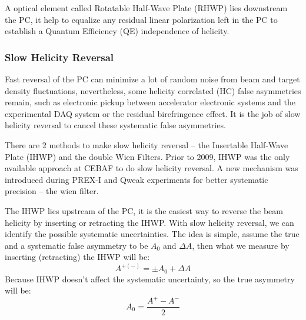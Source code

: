 A optical element called Rotatable Half-Wave Plate (RHWP) lies downstream the PC,
it help to equalize any residual linear polarization left in the PC to establish 
a Quantum Efficiency (QE) independence of helicity.

\subsubsection{Slow Helicity Reversal}
Fast reversal of the PC can minimize a lot of random noise from beam and target
density fluctuations, nevertheless, some helicity correlated (HC) false asymmetries
remain, such as electronic pickup between accelerator electronic systems and 
the experimental DAQ system or the residual birefringence effect. It is the 
job of slow helicity reversal to cancel these systematic false asymmetries.

There are 2 methods to make slow helicity reversal -- the Insertable Half-Wave Plate (IHWP) 
and the double Wien Filters. Prior to 2009, IHWP was the only available approach
at CEBAF to do slow helicity reversal. A new mechanism was introduced during 
PREX-I and Qweak experiments for better systematic precision -- the wien filter.

The IHWP lies upstream of the PC, it is the easiest way to reverse the beam 
helicity by inserting or retracting the IHWP. With slow helicity reversal, we 
can identify the possible systematic uncertainties. The idea
is simple, assume the true and a systematic false asymmetry to be $A_0$ and $\Delta A$,
then what we measure by inserting (retracting) the IHWP will be:
\begin{equation}
    A^{+(-)} = \pm A_0  + \Delta A
\end{equation}
Because IHWP doesn't affect the systematic uncertainty, so the true asymmetry
will be:
\begin{equation}
    A_0 = \frac{A^+ - A^-}{2}
\end{equation}

